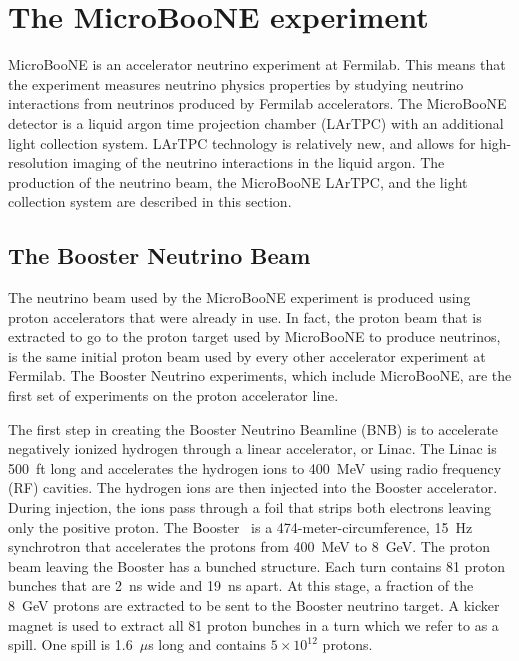 \section{The MicroBooNE experiment}\label{microboone}
MicroBooNE is an accelerator neutrino experiment at Fermilab. This means that
the experiment measures neutrino physics properties by studying neutrino
interactions from neutrinos produced by Fermilab accelerators. The MicroBooNE
detector is a liquid argon time projection chamber (LArTPC) with an additional
light collection system. LArTPC technology is relatively new, and allows for
high-resolution imaging of the neutrino interactions in the liquid argon. The
production of the neutrino beam, the MicroBooNE LArTPC, and the light
collection system are described in this section.

\subsection{The Booster Neutrino Beam}\label{sec:beam}
  The neutrino beam used by the MicroBooNE experiment is produced using proton
  accelerators that were already in use. In fact, the proton beam that is
  extracted to go to the proton target used by MicroBooNE to produce neutrinos,
  is the same initial proton beam used by every other accelerator experiment at
  Fermilab. The Booster Neutrino experiments, which include MicroBooNE, are the
  first set of experiments on the proton accelerator line.

  The first step in creating the Booster Neutrino Beamline (BNB) is to
  accelerate negatively ionized hydrogen through a linear accelerator, or
  Linac. The Linac is 500~ft long and accelerates the hydrogen ions to
  400~MeV using radio frequency (RF) cavities. The hydrogen ions are then
  injected into the Booster accelerator. During injection, the ions pass
  through a foil that strips both electrons leaving only the positive proton.
  The Booster~\cite{MinibooneBeam} is a 474-meter-circumference, 15~Hz
  synchrotron that accelerates the protons from 400~MeV to 8~GeV. The proton
  beam leaving the Booster has a bunched structure. Each turn contains 81
  proton bunches that are 2~ns wide and 19~ns apart. At this stage, a
  fraction of the 8~GeV protons are extracted to be sent to the Booster
  neutrino target. A kicker magnet is used to extract all 81 proton bunches
  in a turn which we refer to as a spill. One spill is 1.6~$\mu$s long and
  contains $5\times 10^{12}$ protons.

